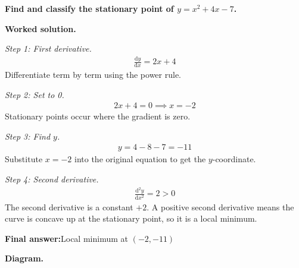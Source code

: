 \documentclass[11pt]{article}
\newcommand{\question}[1]{\par\medskip\noindent\textbf{#1}\par}
\begin{document}
\question{Find and classify the stationary point of \( y = x^2 + 4x - 7 \).}

\textbf{Worked solution.}

\textit{Step 1: First derivative.}
\[\begin{gathered}
\frac{\mathrm{d}y}{\mathrm{d}x} = 2x + 4
\end{gathered}\]
Differentiate term by term using the power rule.

\textit{Step 2: Set to 0.}
\[\begin{gathered}
2x + 4 = 0 \implies x = -2
\end{gathered}\]
Stationary points occur where the gradient is zero.

\textit{Step 3: Find \( y \).}
\[\begin{gathered}
y = 4 - 8 - 7 = -11
\end{gathered}\]
Substitute \( x = -2 \) into the original equation to get the \(y\)-coordinate.

\textit{Step 4: Second derivative.}
\[\begin{gathered}
\frac{\mathrm{d}^2y}{\mathrm{d}x^2} = 2 > 0
\end{gathered}\]
The second derivative is a constant \(+2\). A positive second derivative means the curve is concave up at the stationary point, so it is a local minimum.

\begin{answerbox}
\textbf{Final answer:}\quad Local minimum at \(\displaystyle  (-2, -11) \)
\end{answerbox}
\textbf{Diagram.}
\end{document}
